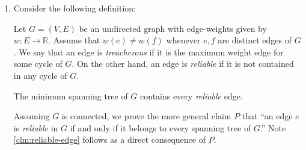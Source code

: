 \documentclass{article}
\begin{document}
\begin{enumerate}[leftmargin={*}, font={\bf}, label={\arabic*.}, ref={\arabic*}]
    {\itshape Time Analysis}

    Let $V$ represent the different sites on the map and $E$ the routes between them. Then we can
    construct $G$ in $\O(V+E)$ time. A call to Dijkstra on $G$ takes $\O((E+V) \log V)$ and the
    reconstruction of $p$ takes at most $\O(V)$ with backtracking. This yields a total running time
    of $\O((E+V) \log V)$.

  \item
    Consider the following definition:
    \begin{definition*}
      Let $G = (V, E)$ be an undirected graph with edge-weights given by $w \colon E \rightarrow
      \mathbb{R}$. Assume that $w(e) \neq w(f)$ whenever $e, f$ are distinct edges of $G$.  We say
      that an edge is \textit{treacherous} if it is the maximum weight edge for some cycle of $G$.
      On the other hand, an edge is \textit{reliable} if it is not contained in any cycle of $G$.
    \end{definition*}

    \begin{claim}
      \label{clm:reliable-edge}
      The minimum spanning tree of $G$ contains every \textit{reliable} edge.
    \end{claim}

    \begin{proof*}
      Assuming $G$ is connected, we prove the more general claim $P$ that ``an edge $e$ is
      \textit{reliable} in $G$ if and only if it belongs to every spanning tree of $G$.'' Note
      \autoref{clm:reliable-edge} follows as a direct consequence of $P$.

    \end{proof*}


\end{enumerate}
\end{document}

